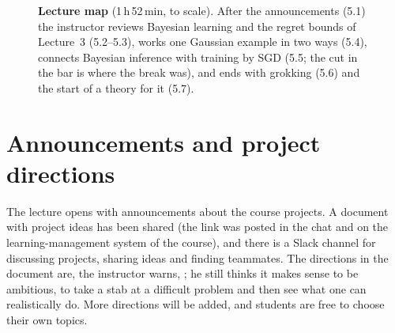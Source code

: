 \begin{figure}[tb]
\centering
{}
\caption{\textbf{Lecture map} (1\,h\,52\,min, to scale). After the announcements (5.1) the instructor reviews Bayesian learning and the regret bounds of Lecture~3 (5.2--5.3), works one Gaussian example in two ways (5.4), connects Bayesian inference with training by SGD (5.5; the cut in the bar is where the break was), and ends with grokking (5.6) and the start of a theory for it (5.7).}
\end{figure}

\section{Announcements and project directions}\label{sec:L5-announce}
The lecture opens with announcements about the course projects. A document with project ideas has been shared (the link was posted in the chat and on the learning-management system of the course), and there is a Slack channel for discussing projects, sharing ideas and finding teammates. The directions in the document are, the instructor warns, ; he still thinks it makes sense to be ambitious, to take a stab at a difficult problem and then see what one can realistically do. More directions will be added, and students are free to choose their own topics.

